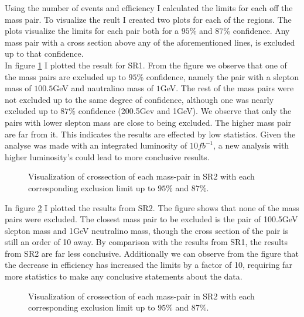 \documentclass{article}
\begin{document}
\egroup
Using the number of events and efficiency I calculated the limits for each off the mass pair. To visualize the reult I created two plots for each of the regions. The plots visualize the limits for each pair both for a $95\%$ and $87\%$ confidence. Any mass pair with a cross section above any of the aforementioned lines, is excluded up to that confidence. 
\\
In figure \ref{fig:ExlusionSR1} I plotted the result for SR1. From the figure we observe that one of the mass pairs are excluded up to $95\%$ confidence, namely the pair with a slepton mass of $100.5$GeV and nautralino mass of $1$GeV. The rest of the mass pairs were not excluded up to the same degree of confidence, although one was nearly excluded up to $87\%$ confidence (200.5Gev and 1GeV). We observe that only the pairs with lower slepton mass are close to being excluded. The higher mass pair are far from it. This indicates the results are effected by low statistics. Given the analyse was made with an integrated luminosity of $10fb^{-1}$, a new analysis with higher luminosity's could lead to more conclusive results.
\\
\begin{figure}
     \caption{Visualization of crossection of each mass-pair in SR2 with each corresponding exclusion limit up to $95\%$ and $87\%$.}
     \label{fig:ExlusionSR1}
\end{figure}
In figure \ref{fig:ExlusionSR2} I plotted the results from SR2. The figure shows that none of the mass pairs were excluded. The closest mass pair to be excluded is the pair of 100.5GeV slepton mass and 1GeV neutralino mass, though the cross section of the pair is still an order of 10 away. By comparison with the results from SR1, the results from SR2 are far less conclusive. Additionally we can observe from the figure that the decrease in efficiency has increased the limits by a factor of 10, requiring far more statistics to make any conclusive statements about the data. \\
\begin{figure}
     \caption{Visualization of crossection of each mass-pair in SR2 with each corresponding exclusion limit up to $95\%$ and $87\%$.}
     \label{fig:ExlusionSR2}
\end{figure}
\end{document}
